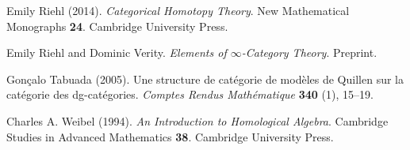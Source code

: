 \begin{thebibliography}{MMMM}
     Emily Riehl (2014).
    \emph{Categorical Homotopy Theory}.
    New Mathematical Monographs \textbf{24}.
    Cambridge University Press.

     Emily Riehl and Dominic Verity.
    \emph{Elements of $\infty$-Category Theory}. Preprint.

     Gonçalo Tabuada (2005).
    Une structure de catégorie de modèles de Quillen sur la catégorie des dg-catégories.
    \emph{Comptes Rendus Mathématique} \textbf{340} (1), 15--19.

     Charles A. Weibel (1994).
    \emph{An Introduction to Homological Algebra}.
    Cambridge Studies in Advanced Mathematics \textbf{38}.
    Cambridge University Press.
\end{thebibliography}

